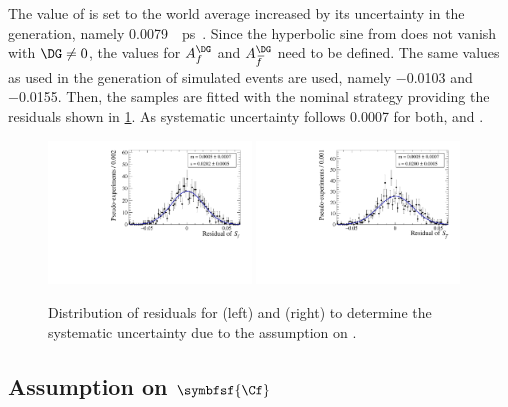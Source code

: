 The value of \DG is set to the world average increased by its uncertainty in the generation, namely \SI{0.0079}{\per\pico\second}~\cite{HFLAV2016}.
Since the hyperbolic sine from  does not vanish with $\DG\neq0$, the values for $A_f^{\DG}$ and $A_{\kern 1.5pt\overline{\kern -1.5pt f\kern 1.5pt}}^{\DG}$ need to be defined.
The same values as used in the generation of simulated events are used, namely \num{-0.0103} and \num{-0.0155}.
Then, the samples are fitted with the nominal strategy providing the residuals shown in \cref{fig:systUncertDG}.
As systematic uncertainty follows \num{0.0007} for both, \Sf and \Sfbar.
\begin{figure}[tbp]
    \centering
    \includegraphics[width=0.48\textwidth]{11Systematics/figs/DG_Sf_res.pdf}
    \includegraphics[width=0.48\textwidth]{11Systematics/figs/DG_Sfbar_res.pdf}
    \caption{Distribution of residuals for \Sf (left) and \Sfbar (right) to determine the systematic uncertainty due to the assumption on \DG.}
    \label{fig:systUncertDG}
\end{figure}

\subsection*{Assumption on $\symbfsf{\Cf}$}

